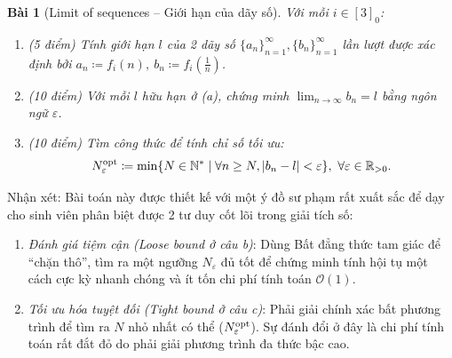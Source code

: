 \documentclass{article}
\newtheorem{baitoan}{Bài}
\begin{document}
\begin{baitoan}[Limit of sequences -- Giới hạn của dãy số]
	Với mỗi $i\in[3]_0$:
	\begin{enumerate}[label=(\alph*)]
		\item {\rm(5 điểm)} Tính giới hạn $l$ của 2 dãy số $\{a_n\}_{n=1}^\infty,\{b_n\}_{n=1}^\infty$ lần lượt được xác định bởi $a_n\coloneqq f_i(n),\ b_n\coloneqq f_i\left(\frac{1}{n}\right)$.
		\item {\rm(10 điểm)} Với mỗi $l$ hữu hạn ở (a), chứng minh $\lim_{n\to\infty} b_n = l$ bằng ngôn ngữ $\varepsilon$.
		\item {\rm(10 điểm)} Tìm công thức để tính chỉ số tối ưu:
		\begin{equation*}
			N_\varepsilon^{\rm opt} \coloneqq \min \{ N \in \mathbb{N}^* \mid \forall n\ge N, |b_n - l| < \varepsilon \},\ \forall\varepsilon\in\mathbb{R}_{> 0}.
		\end{equation*}
	\end{enumerate}
\end{baitoan}

\textsf{Nhận xét}: Bài toán này được thiết kế với một ý đồ sư phạm rất xuất sắc để dạy cho sinh viên phân biệt được 2 tư duy cốt lõi trong giải tích số:
\begin{enumerate}
	\item \textit{Đánh giá tiệm cận (Loose bound ở câu b)}: Dùng Bất đẳng thức tam giác để ``chặn thô'', tìm ra một ngưỡng $N_\varepsilon$ đủ tốt để chứng minh tính hội tụ một cách cực kỳ nhanh chóng và ít tốn chi phí tính toán $\mathcal{O}(1)$.
	\item \textit{Tối ưu hóa tuyệt đối (Tight bound ở câu c)}: Phải giải chính xác bất phương trình để tìm ra $N$ nhỏ nhất có thể ($N_\varepsilon^{\rm opt}$). Sự đánh đổi ở đây là chi phí tính toán rất đắt đỏ do phải giải phương trình đa thức bậc cao.
\end{enumerate}
\end{document}
